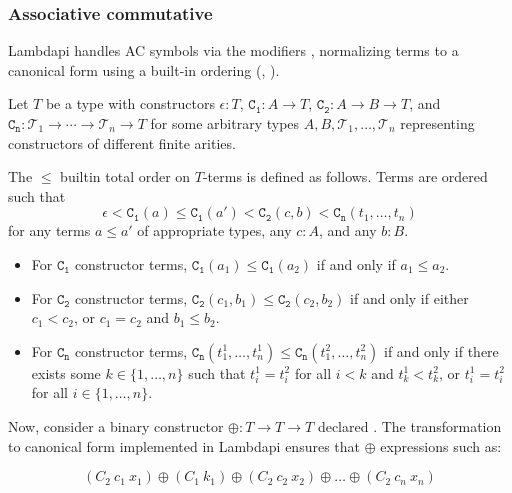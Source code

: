 \subsubsection{Associative commutative}\label{ssec:assoc}

Lambdapi handles \ac{AC} symbols via the modifiers , normalizing terms to a canonical form using a built-in ordering (\cite{ACorigin}, \cite[\S 5]{univAC}).

\begin{definition}\label{def:builtin-order-relation}
Let $T$ be a type with constructors $\epsilon : T$, $\mathtt{C_1} : A \to T$, $\mathtt{C_2} : A \to B \to T$, and $\mathtt{C_n} : \mathcal{T}_1 \to \cdots \to \mathcal{T}_n \to T$ for some arbitrary types $A, B, \mathcal{T}_1, \ldots, \mathcal{T}_n$ representing constructors of different finite arities.

The $\leq$ builtin total order on $T$-terms is defined as follows. Terms are ordered such that
\[
  \epsilon < \mathtt{C_1}(a) \leq \mathtt{C_1}(a') < \mathtt{C_2}(c, b) < \mathtt{C_n}(t_1, \ldots, t_n)
\]
for any terms $a \leq a'$ of appropriate types, any $c : A$, and any $b : B$.

\begin{itemize}
\item For $\mathtt{C_1}$ constructor terms, $\mathtt{C_1}(a_1) \leq \mathtt{C_1}(a_2)$ if and only if $a_1 \leq a_2$.

  \item For $\mathtt{C_2}$ constructor terms, $\mathtt{C_2}(c_1, b_1) \leq \mathtt{C_2}(c_2, b_2)$ if and only if either $c_1 < c_2$, or $c_1 = c_2$ and $b_1 \leq b_2$.

  \item For $\mathtt{C_n}$ constructor terms, $\mathtt{C_n}(t_1^{1}, \ldots, t_n^{1}) \leq \mathtt{C_n}(t_1^{2}, \ldots, t_n^{2})$ if and only if there exists some $k \in \{1, \ldots, n\}$ such that $t_i^{1} = t_i^{2}$ for all $i < k$ and $t_k^{1} < t_k^{2}$, or $t_i^{1} = t_i^{2}$ for all $i \in \{1, \ldots, n\}$.
\end{itemize}
\end{definition}

Now, consider a binary constructor $\oplus: T \to T \to T$ declared .
The transformation to canonical form implemented in Lambdapi ensures that $\oplus$ expressions such as:

\[
  (C_2~c_1~x_1) \oplus (C_1~k_1) \oplus (C_2~c_2~x_2) \oplus \dots \oplus (C_2~c_n~x_n)
\]

